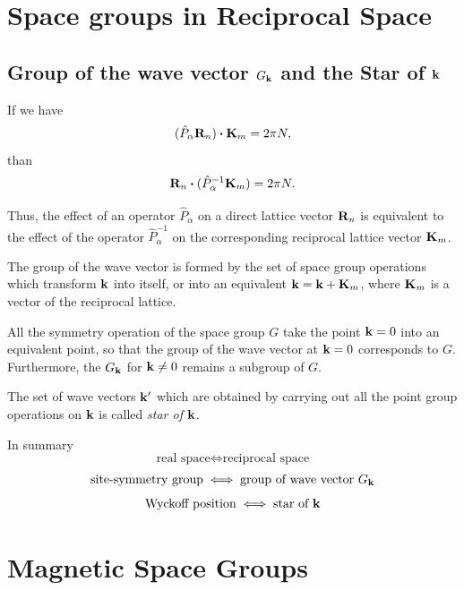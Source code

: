\section{Space groups in Reciprocal Space}

\subsection{Group of the wave vector $G_{{\vb{k}}}$ and the Star of ${\vb{k}}$}

If we have
$$
(\hat{P}_\alpha \R_n) \vdot \K_m = 2 \pi N,
$$
than
$$
\R_n \vdot (\hat{P}_\alpha^{-1} \K_m) = 2 \pi N.
$$

Thus, the effect of an operator $\hat{P}_\alpha$ on a direct lattice vector ${\vb{R}}_n$ is equivalent to the effect of the operator $\hat{P}_\alpha^{-1}$ on the corresponding reciprocal lattice vector ${\vb{K}}_m$.

\n

The group of the wave vector is formed by the set of space group operations which transform ${\vb{k}}$ into itself, or into an equivalent ${\vb{k}} = {\vb{k}} + {\vb{K}}_m$, where ${\vb{K}}_m$ is a vector of the reciprocal lattice.

All the symmetry operation of the space group $G$ take the point ${\vb{k}} = 0$ into an equivalent point, so that the group of the wave vector at ${\vb{k}} = 0$ corresponds to $G$. Furthermore, the $G_{\vb{k}}$ for ${\vb{k}} \neq 0$ remains a subgroup of $G$.

\n

The set of wave vectors ${\vb{k}}'$ which are obtained by carrying out all the point group operations on ${\vb{k}}$ is called \textit{star of} ${\vb{k}}$.

\n

In summary
$$
\text{real space} \iff \text{reciprocal space}
$$
$$
\text{site-symmetry group} \iff \text{group of wave vector }G_{\vb{k}}
$$
$$
\text{Wyckoff position} \iff \text{star of }{\vb{k}}
$$

\section{Magnetic Space Groups}

